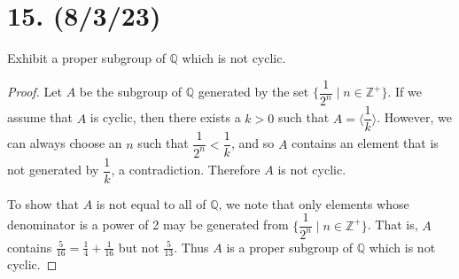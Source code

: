 \documentclass{article}
\begin{document}
\section*{15. (8/3/23)}

Exhibit a proper subgroup of $\mathbb{Q}$ which is not cyclic.

\begin{proof}
    Let $A$ be the subgroup of $\mathbb{Q}$ generated by the set $\{ \dfrac{1}{2^n} \mid n \in \mathbb{Z}^+ \}$. If we assume that $A$ is cyclic, then there exists a $k > 0$ such that $A = \langle \dfrac{1}{k} \rangle$. However, we can always choose an $n$ such that $\dfrac{1}{2^n} < \dfrac{1}{k}$, and so $A$ contains an element that is not generated by $\dfrac{1}{k}$, a contradiction. Therefore $A$ is not cyclic.

    To show that $A$ is not equal to all of $\mathbb{Q}$, we note that only elements whose denominator is a power of 2 may be generated from $\{ \dfrac{1}{2^n} \mid n \in \mathbb{Z}^+ \}$. That is, $A$ contains $\frac{5}{16} = \frac{1}{4} + \frac{1}{16}$ but not $\frac{5}{13}$. Thus $A$ is a proper subgroup of $\mathbb{Q}$ which is not cyclic.
\end{proof}
\end{document}
